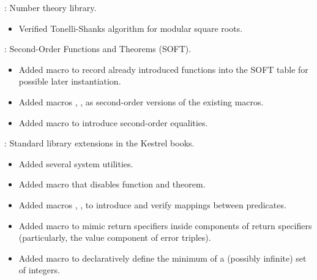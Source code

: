 
\begin{frame}

\implibtitle

:
Number theory library.
\begin{itemize}
\item Verified Tonelli-Shanks algorithm for modular square roots.
\end{itemize}
\end{frame}


\begin{frame}

\implibtitle

:
Second-Order Functions and Theorems (SOFT).
\begin{itemize}
\item Added macro  to record already introduced functions
      into the SOFT table for possible later instantiation.
\item Added macros , , 
      as second-order versions of the existing macros.
\item Added macro  to introduce second-order equalities.
\end{itemize}

\end{frame}


\begin{frame}

\implibtitle

:
Standard library extensions in the Kestrel books.
\begin{itemize}
\item Added several system utilities.
\item Added macro  that disables function and theorem.
\item Added macros , , 
      to introduce and verify mappings between predicates.
\item Added macro  to mimic  return specifiers
      inside components of  return specifiers
      (particularly, the value component of error triples).
\item Added macro  to declaratively define
      the minimum of a (possibly infinite) set of integers.
\end{itemize}

\end{frame}

